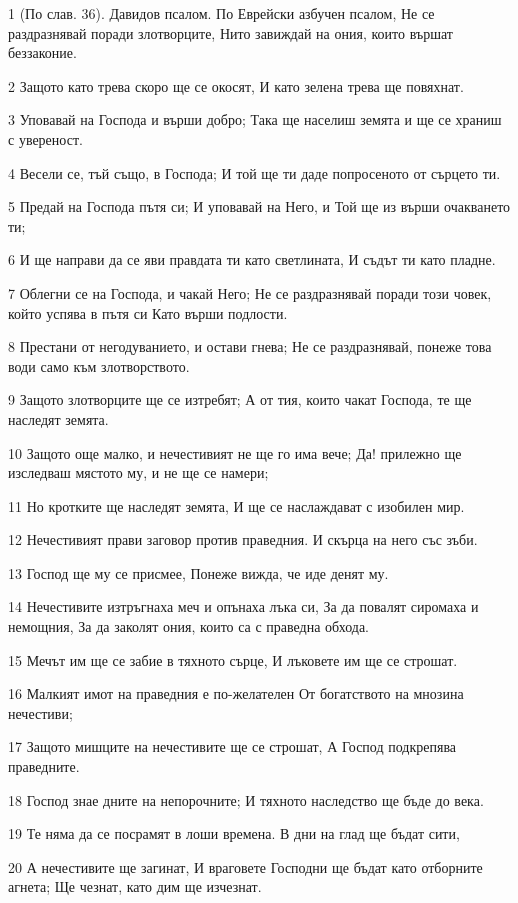\par 1 (По слав. 36). Давидов псалом. По Еврейски азбучен псалом, Не се раздразнявай поради злотворците, Нито завиждай на ония, които вършат беззаконие.
\par 2 Защото като трева скоро ще се окосят, И като зелена трева ще повяхнат.
\par 3 Уповавай на Господа и върши добро; Така ще населиш земята и ще се храниш с увереност.
\par 4 Весели се, тъй също, в Господа; И той ще ти даде попросеното от сърцето ти.
\par 5 Предай на Господа пътя си; И уповавай на Него, и Той ще из върши очакването ти;
\par 6 И ще направи да се яви правдата ти като светлината, И съдът ти като пладне.
\par 7 Облегни се на Господа, и чакай Него; Не се раздразнявай поради този човек, който успява в пътя си Като върши подлости.
\par 8 Престани от негодуванието, и остави гнева; Не се раздразнявай, понеже това води само към злотворството.
\par 9 Защото злотворците ще се изтребят; А от тия, които чакат Господа, те ще наследят земята.
\par 10 Защото още малко, и нечестивият не ще го има вече; Да! прилежно ще изследваш мястото му, и не ще се намери;
\par 11 Но кротките ще наследят земята, И ще се наслаждават с изобилен мир.
\par 12 Нечестивият прави заговор против праведния. И скърца на него със зъби.
\par 13 Господ ще му се присмее, Понеже вижда, че иде денят му.
\par 14 Нечестивите изтръгнаха меч и опънаха лъка си, За да повалят сиромаха и немощния, За да заколят ония, които са с праведна обхода.
\par 15 Мечът им ще се забие в тяхното сърце, И лъковете им ще се строшат.
\par 16 Малкият имот на праведния е по-желателен От богатството на мнозина нечестиви;
\par 17 Защото мишците на нечестивите ще се строшат, А Господ подкрепява праведните.
\par 18 Господ знае дните на непорочните; И тяхното наследство ще бъде до века.
\par 19 Те няма да се посрамят в лоши времена. В дни на глад ще бъдат сити,
\par 20 А нечестивите ще загинат, И враговете Господни ще бъдат като отборните агнета; Ще чезнат, като дим ще изчезнат.
